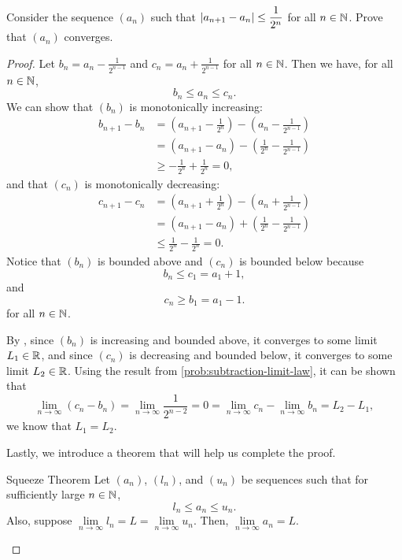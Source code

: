 \begin{problem}
  Consider the sequence $(a_{n})$ such that $\left\lvert a_{n+1} - a_{n} \right\rvert \leq \dfrac{1}{2^{n}}$ 
  for all $n \in \mathbb{N}$. Prove that $(a_{n})$ converges.

  \begin{proof}
    Let $b_{n} = a_{n} - \frac{1}{2^{n-1}}$ and $c_{n} = a_{n} + \frac{1}{2^{n-1}}$
    for all $n \in \mathbb{N}$. Then we have, for all $n \in \mathbb{N}$,
    \[
      b_{n} \leq a_{n} \leq c_{n}.
    \]
    We can show that $(b_{n})$ is monotonically increasing:
    \begin{align*}
      b_{n+1} - b_{n} &= \left( a_{n+1} - \frac{1}{2^{n}} \right) - \left( a_{n} - \frac{1}{2^{n-1}} \right) \\
      &= (a_{n+1} - a_{n}) - \left( \frac{1}{2^{n}} - \frac{1}{2^{n-1}} \right) \\
      &\geq -\frac{1}{2^{n}} + \frac{1}{2^{n}} = 0,
    \end{align*}
    and that $(c_{n})$ is monotonically decreasing:
    \begin{align*}
      c_{n+1} - c_{n} &= \left( a_{n+1} + \frac{1}{2^{n}} \right) - \left( a_{n} + \frac{1}{2^{n-1}} \right) \\
      &= (a_{n+1} - a_{n}) + \left( \frac{1}{2^{n}} - \frac{1}{2^{n-1}} \right) \\
      &\leq \frac{1}{2^{n}} - \frac{1}{2^{n}} = 0.
    \end{align*}
    Notice that $(b_{n})$ is bounded above and $(c_{n})$ is bounded below because
    \[
      b_{n} \leq c_{1} = a_{1} + 1,
    \]
    and 
    \[
      c_{n} \geq b_{1} = a_{1} - 1.
    \]
    for all $n \in \mathbb{N}$.

    By , since $(b_{n})$ is increasing and
    bounded above, it converges to some limit $L_{1} \in \mathbb{R}$, and since $(c_{n})$ is
    decreasing and bounded below, it converges to some limit $L_{2} \in \mathbb{R}$. Using the result from 
    \ref{prob:subtraction-limit-law}, it can be shown that
    \[
      \lim_{n \to \infty} (c_{n} - b_{n}) = \lim_{n \to \infty} \frac{1}{2^{n-2}} = 0 = \lim_{n \to \infty} c_{n} - \lim_{n \to \infty} b_{n} = L_{2} - L_{1}, 
    \]
    we know that $L_{1} = L_{2}$. 

    Lastly, we introduce a theorem that will help us complete the proof.

    \begin{theorem}{Squeeze Theorem}
      \label{thm:squeeze-theorem}
      Let $(a_{n})$, $(l_{n})$, and $(u_{n})$ be sequences such that for sufficiently large $n \in \mathbb{N}$,
      \[
        l_{n} \leq a_{n} \leq u_{n}.
      \]
      Also, suppose $\lim\limits_{n \to \infty} l_{n} = L = \lim\limits_{n \to \infty} u_{n}$. 
      Then, $\lim\limits_{n \to \infty} a_{n} = L$.
    \end{theorem}


\end{proof}
\end{problem}
